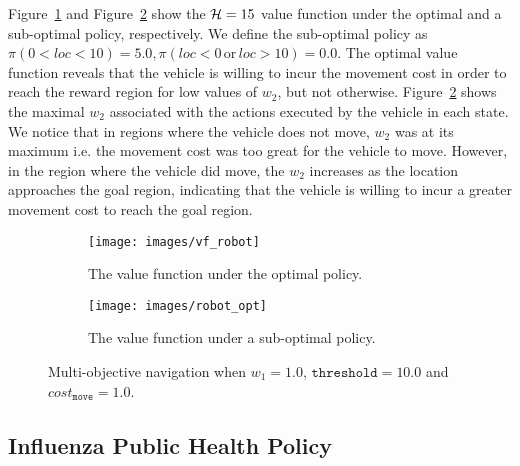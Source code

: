 Figure~\ref{fig:navigation_vf} and Figure~\ref{fig:navigation_opt} show the {\footnotesize$ \mathcal{H} = 15 $} value function under the optimal and a sub-optimal policy, respectively. We define the sub-optimal policy as $ \pi(0 < loc < 10) = 5.0,  \pi(loc < 0 \,\mathrm{or}\, loc > 10) = 0.0$. The optimal value function reveals that the vehicle is willing to incur the movement cost in order to reach the reward region for low values of {\footnotesize $ w_2 $}, but not otherwise. Figure~\ref{fig:navigation_opt} shows the maximal {\footnotesize $ w_2 $} associated with the actions executed by the vehicle in each state. We notice that in regions where the vehicle does not move, {\footnotesize $ w_2 $} was at its maximum i.e. the movement cost was too great for the vehicle to move. However, in the region where the vehicle did move, the {\footnotesize $ w_2 $} increases as the location approaches the goal region, indicating that the vehicle is willing to incur a greater movement cost to reach the goal region.

\begin{figure}[h!]
    \centering
    \begin{subfigure}{0.4\textwidth}
        \texttt{[image: images/vf\_robot]}
        \caption{The value function under the optimal policy.}
            \label{fig:navigation_vf}
    \end{subfigure}
    \begin{subfigure}{0.4\textwidth}
        \texttt{[image: images/robot\_opt]}
        \caption{The value function under a sub-optimal policy.}
            \label{fig:navigation_opt}
    \end{subfigure}
    \caption{Multi-objective navigation when {\footnotesize $w_1 = 1.0$}, {\footnotesize $ \mathtt{threshold} = 10.0 $} and {\footnotesize$ cost_{\mathtt{move}} = 1.0$.}} 
    \label{fig:vehicle1d}            
\end{figure}

\subsection{Influenza Public Health Policy}
\label{sec:results_influenza}

